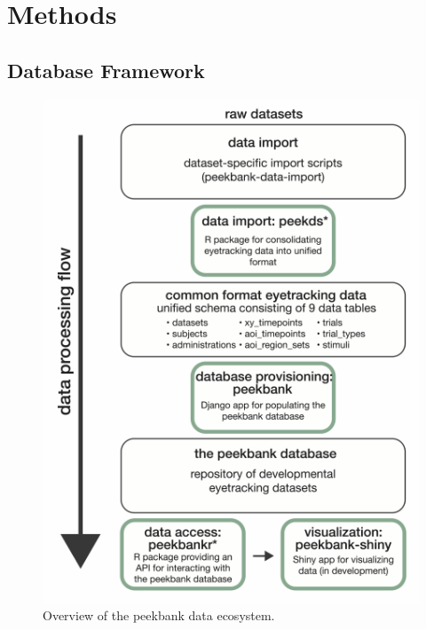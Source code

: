\documentclass[10pt, letterpaper]{article}
\newenvironment{CodeChunk}{}{}
\begin{document}
\hypertarget{methods}{%
\section{Methods}\label{methods}}

\hypertarget{database-framework}{%
\subsection{Database Framework}\label{database-framework}}

\begin{CodeChunk}
\begin{figure}[tb]

{\centering \includegraphics{figs/fig_framework_overview-1} 

}

\caption[Overview of the peekbank data ecosystem]{Overview of the peekbank data ecosystem.}\label{fig:fig_framework_overview}
\end{figure}
\end{CodeChunk}
\end{document}
